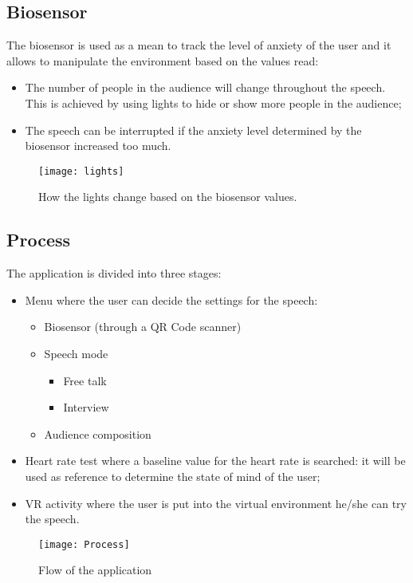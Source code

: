 \subsection{Biosensor}
The biosensor is used as a mean to track the level of anxiety of the user and it allows to manipulate the environment based on the values read:
\begin{itemize}
	\item The number of people in the audience will change throughout the speech. This is achieved by using lights to hide or show more people in the audience;
	\item The speech can be interrupted if the anxiety level determined by the biosensor increased too much.
\end{itemize}
\begin{figure}[H]
	\centering
	\texttt{[image: lights]}
	\caption{How the lights change based on the biosensor values.}
\end{figure}

\subsection{Process}
The application is divided into three stages:
\begin{itemize}
	\item Menu where the user can decide the settings for the speech:
		\begin{itemize}
			\item Biosensor (through a QR Code scanner)
			\item Speech mode
				\begin{itemize}
					\item Free talk
					\item Interview
				\end{itemize}
			\item Audience composition
		\end{itemize}
	\item Heart rate test where a baseline value for the heart rate is searched: it will be used as reference to determine the state of mind of the user;
	\item VR activity where the user is put into the virtual environment he/she can try the speech.
\end{itemize}

\begin{figure}[H]
	\centering
	\texttt{[image: Process]}
	\caption{Flow of the application}
\end{figure}


